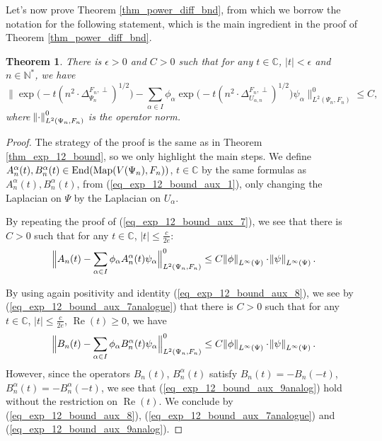 \documentclass[12pt]{article}
\numberwithin{equation}{section}
\theoremstyle{theorem}
\newtheorem{thm}{Theorem}[section]
\theoremstyle{definition}
\theoremstyle{remark}
\newcommand{\comp}{\mathbb{C}}
\newcommand{\nat}{\mathbb{N}}
\newcommand{\enmr}[1]{\text{End}{(#1)}}
\newcommand{\laplcomp}{\Delta}
\renewcommand{\Re}{\operatorname{Re}}
\begin{document}
	\par 
	Let's now prove Theorem \ref{thm_power_diff_bnd}, from which we borrow the notation for the following statement, which is the main ingredient in the proof of Theorem \ref{thm_power_diff_bnd}.
	\begin{thm}\label{thm_exp_12_bound_diff}
		There is $\epsilon > 0$ and $C > 0$ such that for any $t \in \comp$, $|t| < \epsilon$ and $n \in \nat^*$, we have
		\begin{equation}
			\Big\| 
			\exp \big( - t (n^2 \cdot\laplcomp_{\Psi_n}^{F_n, \perp})^{1/2} \big) - \sum_{\alpha \in I} \phi_{\alpha} \exp \big( -t  (n^2 \cdot  \laplcomp_{U_{\alpha, n}}^{F_n, \perp})^{1/2} \big) \psi_{\alpha}
			\Big\|_{L^2(\Psi_n, F_n)}^{0} \leq C,
		\end{equation}
		where $\norm{\cdot}_{L^2(\Psi_n, F_n)}^{0}$ is the operator norm.
	\end{thm}
	\begin{proof}
		The strategy of the proof is the same as in Theorem \ref{thm_exp_12_bound}, so we only highlight the main steps.
		We define $A_n^{\alpha}(t), B_n^{\alpha}(t) \in \enmr{{\rm{Map}}(V(\Psi_n), F_n)}$, $t \in \comp$ by the same formulas as $A_n^{\alpha}(t), B_n^{\alpha}(t)$, from (\ref{eq_exp_12_bound_aux_1}), only changing the Laplacian on $\Psi$ by the Laplacian on $U_{\alpha}$.
		\par 
		By repeating the proof of (\ref{eq_exp_12_bound_aux_7}), we see that there is $C > 0$ such that for any $t \in \comp$, $|t| \leq \frac{c}{2 e}$:
		\begin{equation}\label{eq_exp_12_bound_aux_7analogue}
			\Big\| A_n(t) - \sum_{\alpha \in I} \phi_{\alpha} A_n^{\alpha}(t) \psi_{\alpha} \Big\| _{L^2(\Psi_n, F_n)}^{0}
			\leq
			C \norm{\phi}_{L^{\infty}(\Psi)} \cdot \norm{\psi}_{L^{\infty}(\Psi)}.
		\end{equation}
		\par By using again positivity and identity (\ref{eq_exp_12_bound_aux_8}), we see by (\ref{eq_exp_12_bound_aux_7analogue}) that there is $C > 0$ such that for any $t \in \comp$, $|t| \leq \frac{c}{2 e}$, $\Re(t) \geq 0$, we have
		\begin{equation}\label{eq_exp_12_bound_aux_9analog}
			\Big\| B_n(t) - \sum_{\alpha \in I} \phi_{\alpha} B_n^{\alpha}(t) \psi_{\alpha} \Big\| _{L^2(\Psi_n, F_n)}^{0}
			\leq
			C \norm{\phi}_{L^{\infty}(\Psi)} \cdot \norm{\psi}_{L^{\infty}(\Psi)}.
		\end{equation}
		However, since the operators  $B_n(t)$, $B_n^{\alpha}(t)$ satisfy $B_n(t) = -B_n(-t)$, $B_n^{\alpha}(t) = -B_n^{\alpha}(-t)$, we see that (\ref{eq_exp_12_bound_aux_9analog}) hold without the restriction on $\Re(t)$. We conclude by (\ref{eq_exp_12_bound_aux_8}), (\ref{eq_exp_12_bound_aux_7analogue}) and (\ref{eq_exp_12_bound_aux_9analog}).
	\end{proof}
\end{document}
